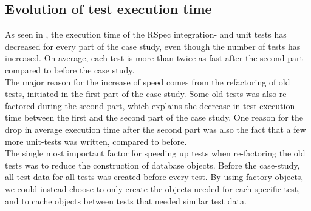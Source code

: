 
\subsection{Evolution of test execution time}

As seen in , the execution time of the RSpec
integration- and unit tests has decreased for every part of the case
study, even though the number of tests has increased. On average, each
test is more than twice as fast after the second part compared to before
the case study.\\

The major reason for the increase of speed comes from the refactoring of
old tests, initiated in the first part of the case study. Some old tests
was also re-factored during the second part, which explains the decrease
in test execution time between the first and the second part of the case
study. One reason for the drop in average execution time after the
second part was also the fact that a few more unit-tests was written,
compared to before.\\

The single most important factor for speeding up tests when re-factoring
the old tests was to reduce the construction of database objects. Before
the case-study, all test data for all tests was created before every
test. By using factory objects, we could instead choose to only create
the objects needed for each specific test, and to cache objects between
tests that needed similar test data.\\
